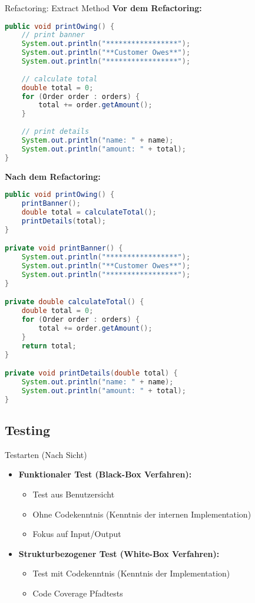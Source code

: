 \begin{example2}{Refactoring: Extract Method}
\textbf{Vor dem Refactoring:}
\begin{lstlisting}[language=Java, style=basesmol]
public void printOwing() {
    // print banner
    System.out.println("*****************");
    System.out.println("**Customer Owes**");
    System.out.println("*****************");
    
    // calculate total
    double total = 0;
    for (Order order : orders) {
        total += order.getAmount();
    }
    
    // print details
    System.out.println("name: " + name);
    System.out.println("amount: " + total);
}
\end{lstlisting}

\textbf{Nach dem Refactoring:}
\begin{lstlisting}[language=Java, style=basesmol]
public void printOwing() {
    printBanner();
    double total = calculateTotal();
    printDetails(total);
}

private void printBanner() {
    System.out.println("*****************");
    System.out.println("**Customer Owes**");
    System.out.println("*****************");
}

private double calculateTotal() {
    double total = 0;
    for (Order order : orders) {
        total += order.getAmount();
    }
    return total;
}

private void printDetails(double total) {
    System.out.println("name: " + name);
    System.out.println("amount: " + total);
}
\end{lstlisting}
\end{example2}

\pagebreak

\subsection{Testing}

\begin{definition}{Testarten} (Nach Sicht)\\
\begin{itemize}
    \item \textbf{Funktionaler Test (Black-Box Verfahren):} 
    \begin{itemize}
        \item Test aus Benutzersicht
        \item Ohne Codekenntnis (Kenntnis der internen Implementation)
        \item Fokus auf Input/Output
    \end{itemize}
    \item \textbf{Strukturbezogener Test (White-Box Verfahren):}
    \begin{itemize}
        \item Test mit Codekenntnis (Kenntnis der Implementation)
        \item Code Coverage Pfadtests
    \end{itemize}
\end{itemize}
\end{definition}

